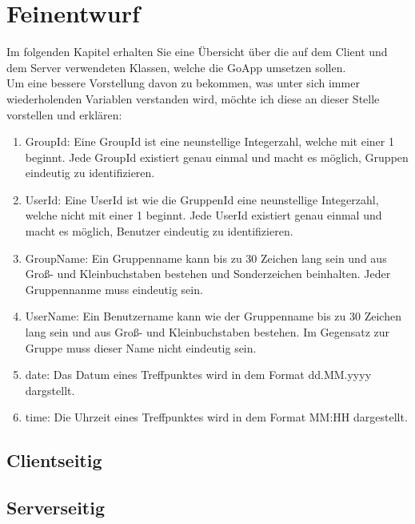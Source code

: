 \section{Feinentwurf}
Im folgenden Kapitel erhalten Sie eine Übersicht über die auf dem Client und dem Server verwendeten Klassen, welche die GoApp umsetzen sollen.\\

Um eine bessere Vorstellung davon zu bekommen, was unter sich immer wiederholenden Variablen verstanden wird, möchte ich diese an dieser Stelle vorstellen und erklären:\\

\begin{enumerate}
	\item GroupId: Eine GroupId ist eine neunstellige Integerzahl, welche mit einer 1 beginnt. Jede GroupId existiert genau einmal und macht es möglich, Gruppen eindeutig zu identifizieren.
	\item UserId: Eine UserId ist wie die GruppenId eine neunstellige Integerzahl, welche nicht mit einer 1 beginnt. Jede UserId existiert genau einmal und macht es möglich, Benutzer eindeutig zu identifizieren.
	\item GroupName: Ein Gruppenname kann bis zu 30 Zeichen lang sein und aus Groß- und Kleinbuchstaben bestehen und Sonderzeichen beinhalten. Jeder Gruppennanme muss eindeutig sein.
	\item UserName: Ein Benutzername kann wie der Gruppenname bis zu 30 Zeichen lang sein und aus Groß- und Kleinbuchstaben bestehen. Im Gegensatz zur Gruppe muss dieser Name nicht eindeutig sein.
	\item date: Das Datum eines Treffpunktes wird in dem Format dd.MM.yyyy dargstellt.
	\item time: Die Uhrzeit eines Treffpunktes wird in dem Format MM:HH dargestellt.
\end{enumerate}

\subsection{Clientseitig}




\subsection{Serverseitig}


